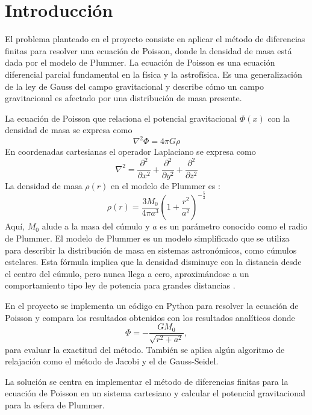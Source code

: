 \documentclass[reprint,amsmath,amssymb,aps]{revtex4-2}
\begin{document}
\section{Introducción}
El problema planteado en el proyecto consiste en aplicar el método de diferencias finitas para resolver una ecuación de Poisson, donde la densidad de masa está dada por el modelo de Plummer. La ecuación de Poisson es una ecuación diferencial parcial fundamental en la física y la astrofísica. Es una generalización de la ley de Gauss del campo gravitacional y describe cómo un campo gravitacional es afectado por una distribución de masa presente. 

La ecuación de Poisson que relaciona el potencial gravitacional $\Phi(x)$ con la densidad de masa se expresa como 
\begin{equation}
    \nabla^2 \Phi = 4 \pi G \rho
\end{equation}
En coordenadas cartesianas el operador Laplaciano se expresa como
\begin{equation}
    \nabla^2 = \frac{\partial^2}{\partial x^2} + \frac{\partial^2}{\partial y^2} + \frac{\partial^2}{\partial z^2}
\end{equation}
La densidad de masa $\rho(r)$ en el modelo de Plummer es \cite{plummer}:
\begin{equation}\label{plummer}
\rho(r) = \frac{3M_0}{4\pi a^3} \left( 1 + \frac{r^2}{a^2} \right)^{-\frac{5}{2}}
\end{equation}
Aquí, $M_0$ alude a la masa del cúmulo y $a$ es un parámetro conocido como el radio de Plummer. El modelo de Plummer es un modelo simplificado que se utiliza para describir la distribución de masa en sistemas astronómicos, como cúmulos estelares. Esta fórmula implica que la densidad disminuye con la distancia desde el centro del cúmulo, pero nunca llega a cero, aproximándose a un comportamiento tipo ley de potencia para grandes distancias \cite{poissonGauss}.

En el proyecto se implementa un código en Python para resolver la ecuación de Poisson y compara los resultados obtenidos con los resultados analíticos donde
\begin{equation}
\varPhi=-\frac{GM_{0}}{\sqrt{r^2+a^2}},
\end{equation}
para evaluar la exactitud del método. También se aplica algún algoritmo de relajación como el método de Jacobi y el de Gauss-Seidel.

La solución se centra en implementar el método de diferencias finitas para la ecuación de Poisson en un sistema cartesiano y calcular el potencial gravitacional para la esfera de Plummer.
\end{document}
